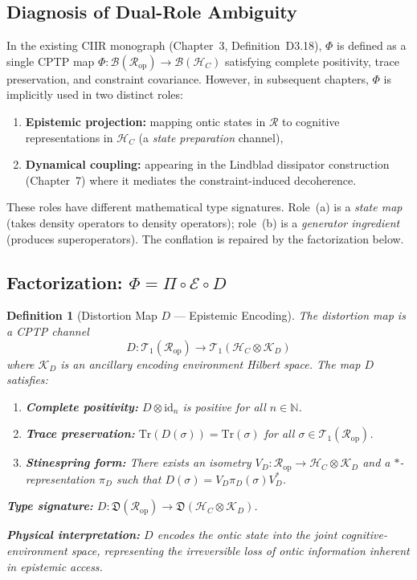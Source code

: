 \documentclass[11pt,a4paper]{article}
\newtheorem{definition}{Definition}[section]
\theoremstyle{remark}
\newcommand{\CR}{\mathcal{R}}
\newcommand{\HC}{\mathcal{H}_C}
\newcommand{\CB}{\mathcal{B}}
\newcommand{\id}{\mathrm{id}}
\newcommand{\Tr}{\mathrm{Tr}}
\begin{document}
\subsection{Diagnosis of Dual-Role Ambiguity}

In the existing CIIR monograph (Chapter~3, Definition~D3.18), $\Phi$ is
defined as a single CPTP map
$\Phi: \CB(\CR_{\mathrm{op}}) \to \CB(\HC)$ satisfying complete
positivity, trace preservation, and constraint covariance.  However, in
subsequent chapters, $\Phi$ is implicitly used in two distinct roles:

\begin{enumerate}[label=(\alph*)]
  \item \textbf{Epistemic projection:} mapping ontic states in $\CR$ to
    cognitive representations in $\HC$ (a \emph{state preparation}
    channel),
  \item \textbf{Dynamical coupling:} appearing in the Lindblad
    dissipator construction (Chapter~7) where it mediates the
    constraint-induced decoherence.
\end{enumerate}

These roles have different mathematical type signatures.  Role~(a) is a
\emph{state map} (takes density operators to density operators);
role~(b) is a \emph{generator ingredient} (produces superoperators).
The conflation is repaired by the factorization below.

\subsection{Factorization: $\Phi = \Pi \circ \mathcal{E} \circ D$}

\begin{definition}[Distortion Map $D$ --- Epistemic Encoding]
\label{def:distortion}
The \emph{distortion map} is a CPTP channel
\[
  D: \mathcal{T}_1(\CR_{\mathrm{op}}) \longrightarrow
     \mathcal{T}_1(\HC \otimes \mathcal{K}_D)
\]
where $\mathcal{K}_D$ is an ancillary \emph{encoding environment} Hilbert
space.  The map $D$ satisfies:
\begin{enumerate}[label=(D\arabic*)]
  \item \textbf{Complete positivity:} $D \otimes \id_n$ is positive for
    all $n \in \mathbb{N}$.
  \item \textbf{Trace preservation:}
    $\Tr(D(\sigma)) = \Tr(\sigma)$ for all
    $\sigma \in \mathcal{T}_1(\CR_{\mathrm{op}})$.
  \item \textbf{Stinespring form:} There exists an isometry
    $V_D: \CR_{\mathrm{op}} \to \HC \otimes \mathcal{K}_D$ and a
    $*$-representation $\pi_D$ such that
    $D(\sigma) = V_D \pi_D(\sigma) V_D^*$.
\end{enumerate}
\textbf{Type signature:}
$D: \mathfrak{D}(\CR_{\mathrm{op}}) \to
    \mathfrak{D}(\HC \otimes \mathcal{K}_D)$.

\textbf{Physical interpretation:} $D$ encodes the ontic state into the
joint cognitive-environment space, representing the irreversible loss of
ontic information inherent in epistemic access.
\end{definition}
\end{document}

